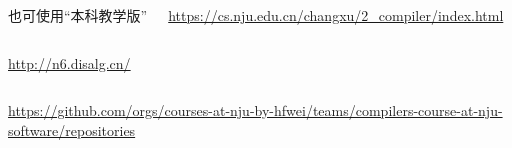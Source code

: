 \begin{frame}{}
  \begin{columns}
      \begin{center}
        也可使用``本科教学版''
      \end{center}
      \begin{center}
        \url{https://cs.nju.edu.cn/changxu/2_compiler/index.html}
      \end{center}
  \end{columns}
\end{frame}

\begin{frame}{}
  \begin{columns}
      \begin{center}
        \url{http://n6.disalg.cn/}
      \end{center}
  \end{columns}

  \begin{center}
    \url{https://github.com/orgs/courses-at-nju-by-hfwei/teams/compilers-course-at-nju-software/repositories}
  \end{center}
\end{frame}
